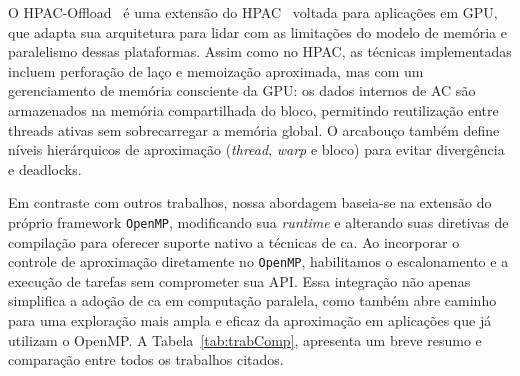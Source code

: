 O HPAC-Offload~\cite{fink2023} é uma extensão do HPAC~\cite{parasyris2021} voltada para aplicações em GPU, que adapta sua arquitetura para lidar com as limitações do modelo de memória e paralelismo dessas plataformas. Assim como no HPAC, as técnicas implementadas incluem perforação de laço e memoização aproximada, mas com um gerenciamento de memória consciente da GPU: os dados internos de AC são armazenados na memória compartilhada do bloco, permitindo reutilização entre threads ativas sem sobrecarregar a memória global. O arcabouço também define níveis hierárquicos de aproximação (\textit{thread}, \textit{warp} e bloco) para evitar divergência e deadlocks.

Em contraste com outros trabalhos, nossa abordagem baseia-se na extensão do próprio framework \texttt{OpenMP}, modificando sua \textit{runtime} e alterando suas diretivas de compilação para oferecer suporte nativo a técnicas de \gls{ca}. Ao incorporar o controle de aproximação diretamente no \texttt{OpenMP}, habilitamos o escalonamento e a execução de tarefas sem comprometer sua API. Essa integração não apenas simplifica a adoção de \gls{ca} em computação paralela, como também abre caminho para uma exploração mais ampla e eficaz da aproximação em aplicações que já utilizam o OpenMP. A Tabela~\ref{tab:trabComp}, apresenta um breve resumo e comparação entre todos os trabalhos citados.

